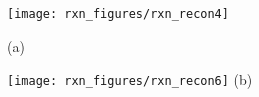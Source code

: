 \documentclass[]{article}
\begin{document}
\centering
\begin{minipage}{0.4\textwidth}
\centering
    \texttt{[image: rxn\_figures/rxn\_recon4]}
    
    (a)
\end{minipage}
\begin{minipage}{0.4\textwidth}
\centering
      \texttt{[image: rxn\_figures/rxn\_recon6]}
(b)
\end{minipage}
\end{document}
